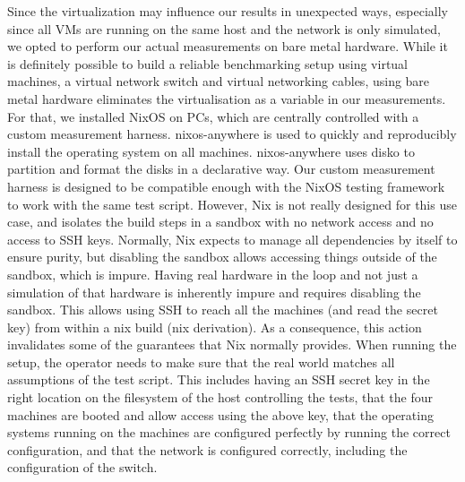 Since the virtualization may influence our results in unexpected ways, especially since all VMs are running on the same host and the network is only simulated, we opted to perform our actual measurements on bare metal hardware.
While it is definitely possible to build a reliable benchmarking setup using virtual machines, a virtual network switch and virtual networking cables, using bare metal hardware eliminates the virtualisation as a variable in our measurements.
For that, we installed NixOS on PCs, which are centrally controlled with a custom measurement harness.
nixos-anywhere \cite{nixos-anywhere} is used to quickly and reproducibly install the operating system on all machines.
nixos-anywhere uses disko \cite{disko} to partition and format the disks in a declarative way.
Our custom measurement harness is designed to be compatible enough with the NixOS testing framework to work with the same test script.
However, Nix is not really designed for this use case, and isolates the build steps in a sandbox with no network access and no access to SSH keys.
Normally, Nix expects to manage all dependencies by itself to ensure purity, but disabling the sandbox allows accessing things outside of the sandbox, which is impure.
Having real hardware in the loop and not just a simulation of that hardware is inherently impure and requires disabling the sandbox.
This allows using SSH to reach all the machines (and read the secret key) from within a nix build (nix derivation).
As a consequence, this action invalidates some of the guarantees that Nix normally provides.
When running the setup, the operator needs to make sure that the real world matches all assumptions of the test script.
This includes having an SSH secret key in the right location on the filesystem of the host controlling the tests, that the four machines are booted and allow access using the above key, that the operating systems running on the machines are configured perfectly by running the correct configuration, and that the network is configured correctly, including the configuration of the switch.

